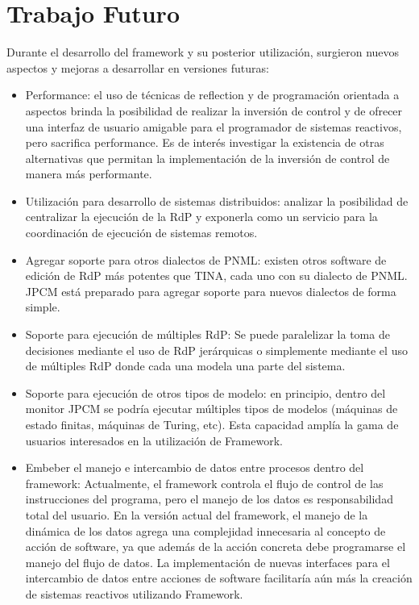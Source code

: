 \section{Trabajo Futuro}
Durante el desarrollo del framework y su posterior utilización, surgieron
nuevos aspectos y mejoras a desarrollar en versiones futuras:
\begin{itemize}
  \item Performance: el uso de técnicas de reflection y de programación
  orientada a aspectos brinda la posibilidad de realizar la inversión de control
  y de ofrecer una interfaz de usuario amigable para el programador de sistemas
  reactivos, pero sacrifica performance. Es de interés investigar la existencia 
  de otras alternativas que permitan la implementación de la inversión de
  control de manera más performante.
  \item Utilización para desarrollo de sistemas distribuidos: analizar la
  posibilidad de centralizar la ejecución de la RdP y exponerla como un servicio
  para la coordinación de ejecución de sistemas remotos.
  \item Agregar soporte para otros dialectos de PNML: existen otros software de
  edición de RdP más potentes que TINA, cada uno con su dialecto de PNML. JPCM
  está preparado para agregar soporte para nuevos dialectos de forma simple.
  \item Soporte para ejecución de múltiples RdP: Se puede paralelizar la toma
  de decisiones mediante el uso de RdP jerárquicas o simplemente mediante el
  uso de múltiples RdP donde cada una modela una parte del sistema.
  \item Soporte para ejecución de otros tipos de modelo: en principio, dentro
  del monitor JPCM se podría ejecutar múltiples tipos de modelos (máquinas de
  estado finitas, máquinas de Turing, etc). Esta capacidad amplía la gama de
  usuarios interesados en la utilización de \nombreFramework Framework.
  \item Embeber el manejo e intercambio de datos entre procesos dentro del
  framework: Actualmente, el framework controla el flujo de control de las
  instrucciones del programa, pero el manejo de los datos es responsabilidad
  total del usuario. En la versión actual del framework, el manejo de la
  dinámica de los datos agrega una complejidad innecesaria
  al concepto de acción de software, ya que además de la acción concreta debe
  programarse el manejo del flujo de datos. La implementación de nuevas
  interfaces para el intercambio de datos entre acciones de software
  facilitaría aún más la creación de sistemas reactivos utilizando
  \nombreFramework Framework.
\end{itemize}


